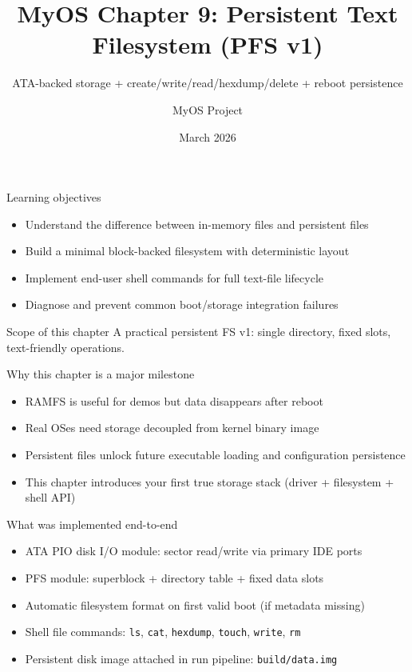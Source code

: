 \documentclass[aspectratio=169]{beamer}
\title[MyOS Chapter 9]{\textbf{MyOS Chapter 9: Persistent Text Filesystem (PFS v1)}}
\subtitle{ATA-backed storage + create/write/read/hexdump/delete + reboot persistence}
\author{MyOS Project}
\date{March 2026}
\institute{x86 Protected Mode Kernel Engineering}
\newcommand{\concept}[2]{%
  \begin{block}{#1}\smallskip #2\smallskip\end{block}\vspace{5pt}}
\begin{document}
\begin{frame}
  \titlepage
\end{frame}

\begin{frame}{Learning objectives}
  \begin{itemize}
    \item Understand the difference between in-memory files and persistent files
    \item Build a minimal block-backed filesystem with deterministic layout
    \item Implement end-user shell commands for full text-file lifecycle
    \item Diagnose and prevent common boot/storage integration failures
  \end{itemize}
  \concept{Scope of this chapter}{
    A practical persistent FS v1: single directory, fixed slots, text-friendly operations.
  }
\end{frame}

\begin{frame}{Why this chapter is a major milestone}
  \begin{itemize}
    \item RAMFS is useful for demos but data disappears after reboot
    \item Real OSes need storage decoupled from kernel binary image
    \item Persistent files unlock future executable loading and configuration persistence
    \item This chapter introduces your first true storage stack (driver + filesystem + shell API)
  \end{itemize}
\end{frame}

\begin{frame}{What was implemented end-to-end}
  \begin{itemize}
    \item ATA PIO disk I/O module: sector read/write via primary IDE ports
    \item PFS module: superblock + directory table + fixed data slots
    \item Automatic filesystem format on first valid boot (if metadata missing)
    \item Shell file commands: \texttt{ls}, \texttt{cat}, \texttt{hexdump}, \texttt{touch}, \texttt{write}, \texttt{rm}
    \item Persistent disk image attached in run pipeline: \texttt{build/data.img}
  \end{itemize}
\end{frame}
\end{document}
